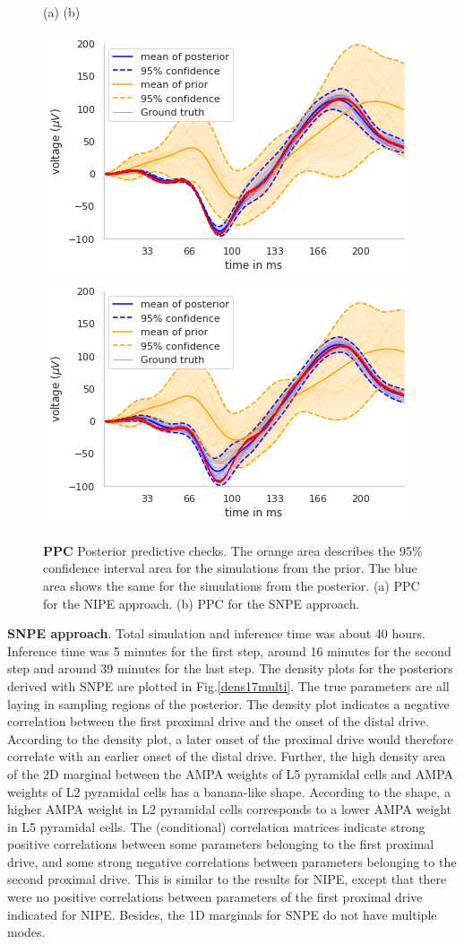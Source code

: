 \documentclass[12pt]{extreport}
\begin{document}
\begin{figure}
 \centering

    \begin{minipage}{12cm}
        \small (a)  \hspace{5.5cm} \small (b)
    \end{minipage}
        \includegraphics[width=0.4\linewidth]{images/thesis_fig4_7a.png}
        \includegraphics[width=0.4\linewidth]{images/thesis_fig4_7b.png}


        

\caption{\label{ppc_nipe_snpe}\textbf{PPC} \small Posterior predictive checks. The orange area describes the 95\% confidence interval area for the simulations from the prior. The blue area shows the same for the simulations from the posterior. (a) PPC for the NIPE approach. (b) PPC for the SNPE approach. }

\end{figure}


\textbf{SNPE approach}. Total simulation and inference time was about 40 hours. Inference time was 5 minutes for the first step, around 16 minutes for the second step and around 39 minutes for the last step.
The density plots for the posteriors derived with SNPE are plotted in Fig.\ref{dens17multi}. The true parameters are all laying in sampling regions of the posterior. The density plot indicates a negative correlation between the first proximal drive and the onset of the distal drive. According to the density plot, a later onset of the proximal drive would therefore correlate with an earlier onset of the distal drive. Further, the high density area of the 2D marginal between the AMPA weights of L5 pyramidal cells and AMPA weights of L2 pyramidal cells has a banana-like shape. According to the shape, a higher AMPA weight in L2 pyramidal cells corresponds to a lower AMPA weight in L5 pyramidal cells. 
The (conditional) correlation matrices indicate strong positive correlations between some parameters belonging to the first proximal drive, and some  strong negative correlations between parameters belonging to the second proximal drive. This is similar to the results for NIPE, except that there were no positive correlations between parameters of the first proximal drive indicated for NIPE. Besides, the 1D marginals for SNPE do not have multiple modes.
\end{document}
